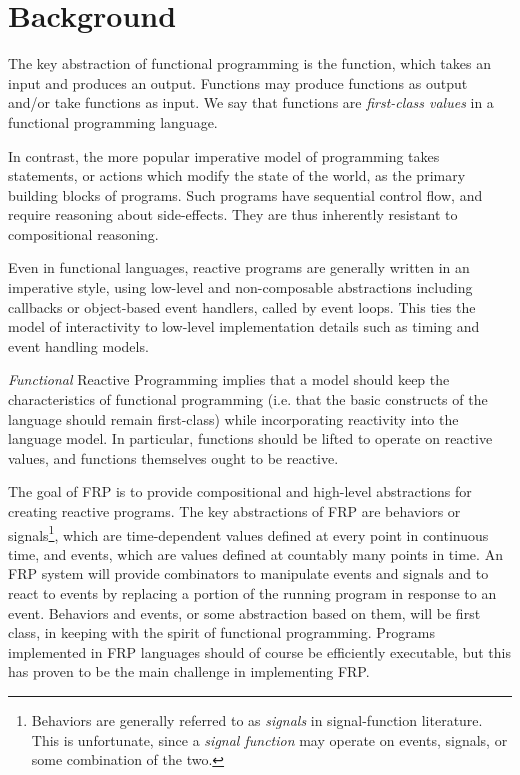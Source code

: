 \chapter{Background}
\label{chapter:Background}

The key abstraction of functional programming is the function, which takes an
input and produces an output. Functions may produce functions as output and/or
take functions as input. We say that functions are {\em first-class values} in a
functional programming language.

In contrast, the more popular imperative model of programming takes statements,
or actions which modify the state of the world, as the primary building blocks
of programs. Such programs have sequential control flow, and require reasoning
about side-effects. They are thus inherently resistant to compositional
reasoning.

Even in functional languages, reactive programs are generally written in an imperative style, using low-level and non-composable abstractions including callbacks
or object-based event handlers, called by event loops. This ties the model of interactivity to low-level implementation details such as timing and event handling models. 

{\em Functional} Reactive Programming implies that a model should keep the characteristics of functional programming (i.e. that the basic constructs of the language
should remain first-class) while incorporating reactivity into the language model. In particular, functions should be lifted to operate on reactive values,
and functions themselves ought to be reactive.

The goal of FRP is to provide compositional and high-level abstractions for
creating reactive programs. The key abstractions of FRP are behaviors or
signals\footnote{Behaviors are generally referred to as {\em signals} in
signal-function literature. This is unfortunate, since a {\em signal function}
may operate on events, signals, or some combination of the two.}, which are
time-dependent values defined at every point in continuous time, and events,
which are values defined at countably many points in time. An FRP system will
provide combinators to manipulate events and signals and to react to events by
replacing a portion of the running program in response to an event. Behaviors
and events, or some abstraction based on them, will be first class, in keeping
with the spirit of functional programming. Programs implemented in FRP languages
should of course be efficiently executable, but this has proven to be the main
challenge in implementing FRP.

